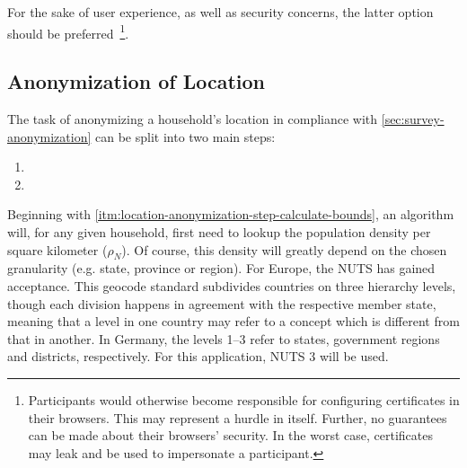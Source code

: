 For the sake of user experience, as well as security concerns, the latter option should be preferred~\footnote{Participants would otherwise become responsible for configuring certificates in their browsers. This may represent a hurdle in itself. Further, no guarantees can be made about their browsers' security. In the worst case, certificates may leak and be used to impersonate a participant.}.


\subsection{Anonymization of Location}
\label{sec:anonymization-of-location-realization}

The task of anonymizing a household's location in compliance with \autoref{sec:survey-anonymization} can be split into two main steps:

\begin{enumerate}[label=(\Alph*)]
  \item {}
  \item {}
\end{enumerate}

Beginning with \ref{itm:location-anonymization-step-calculate-bounds}, an algorithm will, for any given household, first need to lookup the population density per square kilometer ($\rho_N$). Of course, this density will greatly depend on the chosen granularity (e.g. state, province or region). For Europe, the \ac{NUTS} has gained acceptance. This geocode standard subdivides countries on three hierarchy levels, though each division happens in agreement with the respective member state, meaning that a level in one country may refer to a concept which is different from that in another. In Germany, the levels 1--3 refer to states, government regions and districts, respectively. For this application, \ac{NUTS} 3 will be used.

